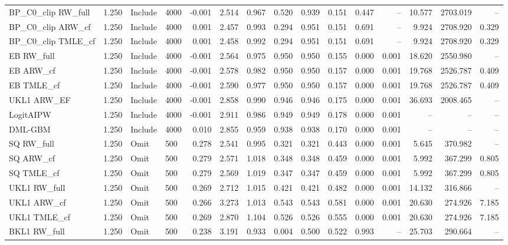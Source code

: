 \begin{tabular}{llllrrrrrrrrrrr}
BP\_C0\_clip RW\_full & 1.250 & Include & 4000 & -0.001 & 2.514 & 0.967 & 0.520 & 0.939 & 0.151 & 0.447 & -- & 10.577 & 2703.019 & -- \\
BP\_C0\_clip ARW\_cf & 1.250 & Include & 4000 & 0.001 & 2.457 & 0.993 & 0.294 & 0.951 & 0.151 & 0.691 & -- & 9.924 & 2708.920 & 0.329 \\
BP\_C0\_clip TMLE\_cf & 1.250 & Include & 4000 & 0.001 & 2.458 & 0.992 & 0.294 & 0.951 & 0.151 & 0.691 & -- & 9.924 & 2708.920 & 0.329 \\
EB RW\_full & 1.250 & Include & 4000 & -0.001 & 2.564 & 0.975 & 0.950 & 0.950 & 0.155 & 0.000 & 0.001 & 18.620 & 2550.980 & -- \\
EB ARW\_cf & 1.250 & Include & 4000 & -0.001 & 2.578 & 0.982 & 0.950 & 0.950 & 0.157 & 0.000 & 0.001 & 19.768 & 2526.787 & 0.409 \\
EB TMLE\_cf & 1.250 & Include & 4000 & -0.001 & 2.590 & 0.977 & 0.950 & 0.950 & 0.157 & 0.000 & 0.001 & 19.768 & 2526.787 & 0.409 \\
UKL1 ARW\_EF & 1.250 & Include & 4000 & -0.001 & 2.858 & 0.990 & 0.946 & 0.946 & 0.175 & 0.000 & 0.001 & 36.693 & 2008.465 & -- \\
LogitAIPW & 1.250 & Include & 4000 & -0.001 & 2.911 & 0.986 & 0.949 & 0.949 & 0.178 & 0.000 & 0.001 & -- & -- & -- \\
DML-GBM & 1.250 & Include & 4000 & 0.010 & 2.855 & 0.959 & 0.938 & 0.938 & 0.170 & 0.000 & 0.001 & -- & -- & -- \\
SQ RW\_full & 1.250 & Omit & 500 & 0.278 & 2.541 & 0.995 & 0.321 & 0.321 & 0.443 & 0.000 & 0.001 & 5.645 & 370.982 & -- \\
SQ ARW\_cf & 1.250 & Omit & 500 & 0.279 & 2.571 & 1.018 & 0.348 & 0.348 & 0.459 & 0.000 & 0.001 & 5.992 & 367.299 & 0.805 \\
SQ TMLE\_cf & 1.250 & Omit & 500 & 0.279 & 2.569 & 1.019 & 0.347 & 0.347 & 0.459 & 0.000 & 0.001 & 5.992 & 367.299 & 0.805 \\
UKL1 RW\_full & 1.250 & Omit & 500 & 0.269 & 2.712 & 1.015 & 0.421 & 0.421 & 0.482 & 0.000 & 0.001 & 14.132 & 316.866 & -- \\
UKL1 ARW\_cf & 1.250 & Omit & 500 & 0.266 & 3.273 & 1.013 & 0.543 & 0.543 & 0.581 & 0.000 & 0.001 & 20.630 & 274.926 & 7.185 \\
UKL1 TMLE\_cf & 1.250 & Omit & 500 & 0.269 & 2.870 & 1.104 & 0.526 & 0.526 & 0.555 & 0.000 & 0.001 & 20.630 & 274.926 & 7.185 \\
BKL1 RW\_full & 1.250 & Omit & 500 & 0.238 & 3.191 & 0.933 & 0.004 & 0.500 & 0.522 & 0.993 & -- & 25.703 & 290.664 & -- \\

\end{tabular}
